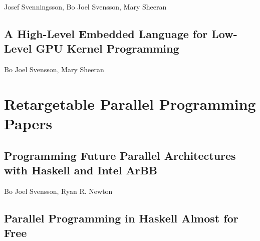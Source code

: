 \documentclass[a4paper]{book}
\newcommand{\paperHL}{A High-Level Embedded Language for Low-Level GPU Kernel Programming}
\newcommand{\paperARBB}{Programming Future Parallel Architectures with Haskell and Intel ArBB}
\newcommand{\paperEMBARBB}{Parallel Programming in Haskell Almost for Free}
\begin{document}
\begin{center} 
Josef Svenningsson, Bo Joel Svensson, Mary Sheeran 
\end{center}





% 
\cleardoublepage 


\section{\paperHL}
\label{sec:paperHL}

\begin{center} 
Bo Joel Svensson, Mary Sheeran
\end{center}






% 

\chapter{Retargetable Parallel Programming Papers}
\label{chap:ArBB}
% 
\cleardoublepage 


\section{\paperARBB}
\label{sec:paperARBB}

\begin{center} 
Bo Joel Svensson, Ryan R. Newton
\end{center}




% 
\cleardoublepage 


\section{\paperEMBARBB}
\label{sec:paperEMBARBB}
\end{document}
